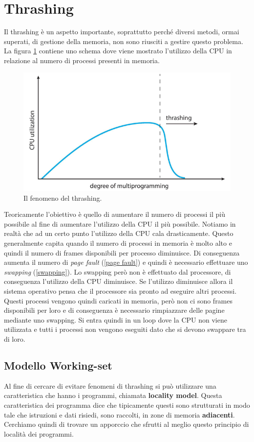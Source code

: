 % 
\section{Thrashing}
Il thrashing è un aspetto importante, soprattutto perché diversi metodi, ormai superati, di gestione della memoria, non sono riusciti a gestire questo problema. La figura \ref{fig:thrashing} contiene uno schema dove viene mostrato l'utilizzo della CPU in relazione al numero di processi presenti in memoria.
\begin{figure}[h]
    \centering
    \includegraphics[width = .5\textwidth]{../res/imgs/virtual memory/thrashing.png}
    \caption{Il fenomeno del thrashing.}
    \label{fig:thrashing}
\end{figure}
Teoricamente l'obiettivo è quello di aumentare il numero di processi il più possibile al fine di aumentare l'utilizzo della CPU il più possibile. Notiamo in realtà che ad un certo punto l'utilizzo della CPU cala drasticamente. Questo generalmente capita quando il numero di processi in memoria è molto alto e quindi il numero di frames disponibili per processo diminuisce. Di conseguenza aumenta il numero di \textit{page fault} (\ref{page fault}) e quindi è necessario effettuare uno \textit{swapping} (\ref{swapping}). Lo swapping però non è effettuato dal processore, di conseguenza l'utilizzo della CPU diminuisce. Se l'utilizzo diminuisce allora il sistema operativo pensa che il processore sia pronto ad eseguire altri processi. Questi processi vengono quindi caricati in memoria, però non ci sono frames disponibili per loro e di conseguenza è necessario rimpiazzare delle pagine mediante uno swapping. Si entra quindi in un loop dove la CPU non viene utilizzata e tutti i processi non vengono eseguiti dato che si devono swappare tra di loro. 

% 
\subsection{Modello Working-set}
Al fine di cercare di evitare fenomeni di thrashing si può utilizzare una caratteristica che hanno i programmi, chiamata \textbf{locality model}. Questa caratteristica dei programma dice che tipicamente questi sono strutturati in modo tale che istruzioni e dati risiedi, sono raccolti, in zone di memoria \textbf{adiacenti}. Cerchiamo quindi di trovare un apporccio che sfrutti al meglio questo principio di località dei programmi.

